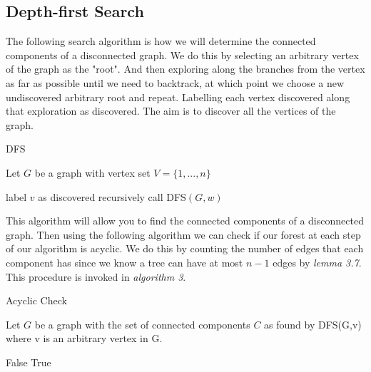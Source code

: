 \documentclass[../main.tex]{subfiles}
\begin{document}
\subsection{Depth-first Search}
The following search algorithm is how we will determine the connected components of a disconnected graph. We do this by selecting an arbitrary vertex of the graph as the "root". And then exploring along the branches from the vertex as far as possible until we need to backtrack, at which point we choose a new undiscovered arbitrary root and repeat. Labelling each vertex discovered along that exploration as discovered. The aim is to discover all the vertices of the graph.

\begin{algorithm}[H]
\caption{DFS}\label{dfs}
Let $G$ be a graph with vertex set $V = \{1,...,n\}$
\begin{algorithmic}[1]
\State label $v$ as discovered
	 	\State recursively call DFS$(G,w)$
	\EndIf
\EndFor
\EndProcedure
\end{algorithmic}
\end{algorithm}

\noindent This algorithm will allow you to find the connected components of a disconnected graph. Then using the following algorithm we can check if our forest at each step of our algorithm is acyclic. We do this by counting the number of edges that each component has since we know a tree can have at most $n-1$ edges by \textit{lemma 3.7}. This procedure is invoked in \textit{algorithm 3}.

\begin{algorithm}[H]
\caption{Acyclic Check}\label{acyclic}
Let $G$ be a graph with the set of connected components $C$ as found by DFS(G,v) where v is an arbitrary vertex in G.
\begin{algorithmic}[1]
		\Return False
	\EndIf
\EndFor
	\Return True
\EndProcedure
\end{algorithmic}
\end{algorithm}
\end{document}
